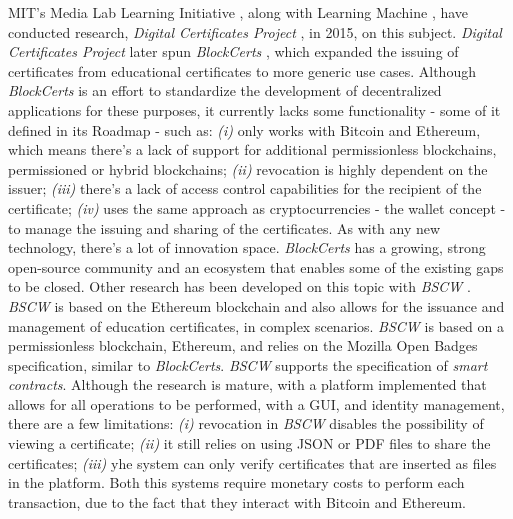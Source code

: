 MIT's Media Lab Learning Initiative \cite{mit_learning_initiative}, along with Learning Machine \cite{learning_machine}, have conducted research, \textit{Digital Certificates Project} \cite{MITCertificates}, in 2015, on this subject. \textit{Digital Certificates Project} later spun \textit{BlockCerts} \cite{Blockcerts}, which expanded the issuing of certificates from educational certificates to more generic use cases. Although \textit{BlockCerts} is an effort to standardize the development of decentralized applications for these purposes, it currently lacks some functionality - some of it defined in its Roadmap - such as: \emph{(i)} only works with Bitcoin and Ethereum, which means there's a lack of support for additional permissionless blockchains, permissioned or hybrid blockchains; \emph{(ii)} revocation is highly dependent on the issuer; \emph{(iii)} there's a lack of access control capabilities for the recipient of the certificate; \emph{(iv)} uses the same approach as cryptocurrencies - the wallet concept - to manage the issuing and sharing of the certificates. As with any new technology, there's a lot of innovation space. \textit{BlockCerts} has a growing, strong open-source community and an ecosystem that enables some of the existing gaps to be closed. Other research has been developed on this topic with \emph{BSCW} \cite{grather_blockchain_2018}. \emph{BSCW} is based on the Ethereum blockchain and also allows for the issuance and management of education certificates, in complex scenarios. \emph{BSCW} is based on a permissionless blockchain, Ethereum, and relies on the Mozilla Open Badges specification, similar to \emph{BlockCerts}. \emph{BSCW} supports the specification of \emph{smart contracts}. Although the research is mature, with a platform implemented that allows for all operations to be performed, with a GUI, and identity management, there are a few limitations: \emph{(i)} revocation in \emph{BSCW} disables the possibility of viewing a certificate; \emph{(ii)} it still relies on using JSON or PDF files to share the certificates; \emph{(iii)} yhe system can only verify certificates that are inserted as files in the platform. Both this systems require monetary costs to perform each transaction, due to the fact that they interact with Bitcoin and Ethereum.